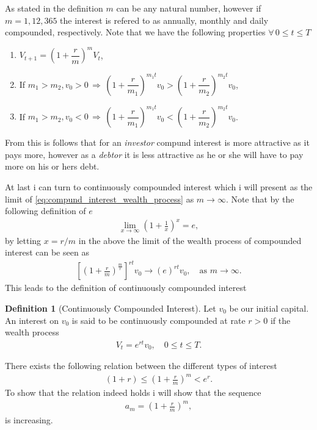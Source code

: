\documentclass{article}
\theoremstyle{definition}
\newtheorem{definition}{Definition}[section]
\numberwithin{equation}{section}
\begin{document}
As stated in the definition $m$ can be any natural number, however if $m = 1, 12, 365$ the interest is refered to as annually, monthly and daily compounded, respectively.
Note that we have the following properties $\forall\, 0 \leq t \leq T$
\begin{enumerate}[label = \textit{\roman*})]
    \item $V_{t + 1} = \left( 1 + \dfrac{r}{m} \right)^{m}V_t$,
    \item If $m_1 > m_2, v_0 > 0 
    \, \Rightarrow \, 
    \left( 1 + \dfrac{r}{m_1} \right)^{m_1t}v_0
    >
    \left( 1 + \dfrac{r}{m_2} \right)^{m_2t}v_0$,
    \item If $m_1 > m_2, v_0 < 0 
    \, \Rightarrow \, 
    \left( 1 + \dfrac{r}{m_1} \right)^{m_1t}v_0
    <
    \left( 1 + \dfrac{r}{m_2} \right)^{m_2t}v_0$.
\end{enumerate}
From this is follows that for an \textit{investor} compund interest is more attractive as it pays more, however as a \textit{debtor} it is less attractive as he or she will have to pay more on his or hers debt.

At last i can turn to continuously compounded interest which i will present as the limit of \eqref{eq:compund_interest_wealth_process} as $m \rightarrow \infty$.
Note that by the following definition of $e$
\begin{align}
    \lim_{x \rightarrow \infty} \left(1 + \frac{1}{x}\right)^x = e,
\end{align}
by letting $x = r/m$ in the above the limit of the wealth process of compounded interest can be seen as
\begin{align}
    \left[\left( 1 + \frac{r}{m} \right)^\frac{m}{r}\right]^{rt}v_0 \rightarrow
    (e)^{rt}v_0, \quad \text{as } m \rightarrow \infty.
\end{align} 
This leads to the definition of continuously compounded interest
\begin{definition}[Continuously Compounded Interest]
    Let $v_0$ be our initial capital.
    An interest on $v_0$ is said to be continuously compounded at rate $r>0$ if the wealth process
    \begin{align}
        V_t = e^{rt}v_0, \quad 0 \leq t \leq T.
    \end{align}
\end{definition}
There exists the following relation between the different types of interest
\begin{align}
    (1 + r) \leq \left(1 + \frac{r}{m}\right)^m < e^r.
\end{align}
To show that the relation indeed holds i will show that the sequence
\begin{align}
    a_m = \left(1 + \frac{r}{m}\right)^m,
\end{align}
is increasing.
\end{document}
